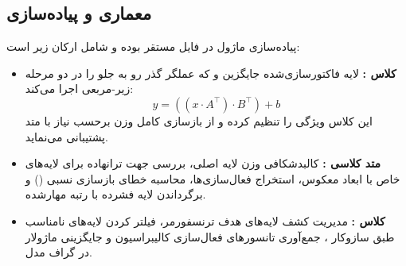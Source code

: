 \subsection{معماری و پیاده‌سازی}
پیاده‌سازی ماژول در فایل  مستقر بوده و شامل ارکان زیر است:
\begin{itemize}
    \item \textbf{کلاس :} لایه فاکتورسازی‌شده جایگزین  و  که عملگر گذر رو به جلو را در دو مرحله زیر-مربعی اجرا می‌کند:
    \begin{equation}
    y = ((x \cdot A^\top) \cdot B^\top) + b
    \end{equation}
    این کلاس ویژگی  را تنظیم کرده و از بازسازی کامل وزن برحسب نیاز با متد  پشتیبانی می‌نماید.
    \item \textbf{متد کلاسی :} کالبدشکافی وزن لایه اصلی، بررسی جهت ترانهاده برای لایه‌های خاص  با ابعاد معکوس، استخراج فعال‌سازی‌ها، محاسبه خطای بازسازی نسبی () و برگرداندن لایه فشرده با رتبه مهارشده.
    \item \textbf{کلاس :} مدیریت کشف لایه‌های هدف ترنسفورمر، فیلتر کردن لایه‌های نامناسب طبق سازوکار ، جمع‌آوری تانسورهای فعال‌سازی کالیبراسیون و جایگزینی ماژولار در گراف مدل.
\end{itemize}

